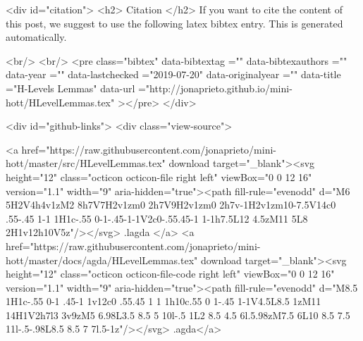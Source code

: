   
  <div id="citation">
  <h2> Citation </h2>
  If you want to cite the content of this post,
  we suggest to use the following latex bibtex entry.
  This is generated automatically.

  <br/>
  <br/>
  <pre class="bibtex"
       data-bibtextag =""
       data-bibtexauthors =""
       data-year =""
       data-lastchecked ="2019-07-20"
       data-originalyear =""
       data-title ="H-Levels Lemmas"
       data-url ="http://jonaprieto.github.io/mini-hott/HLevelLemmas.tex"
  ></pre>
  </div>
  

  <div id="github-links">
    <div class="view-source">
      
        <a href="https://raw.githubusercontent.com/jonaprieto/mini-hott/master/src/HLevelLemmas.tex" download target="_blank"><svg height="12" class="octicon octicon-file right left" viewBox="0 0 12 16" version="1.1" width="9" aria-hidden="true"><path fill-rule="evenodd" d="M6 5H2V4h4v1zM2 8h7V7H2v1zm0 2h7V9H2v1zm0 2h7v-1H2v1zm10-7.5V14c0 .55-.45 1-1 1H1c-.55 0-1-.45-1-1V2c0-.55.45-1 1-1h7.5L12 4.5zM11 5L8 2H1v12h10V5z"/></svg> .lagda </a>
        <a href="https://raw.githubusercontent.com/jonaprieto/mini-hott/master/docs/agda/HLevelLemmas.tex" download target="_blank"><svg height="12" class="octicon octicon-file-code right left" viewBox="0 0 12 16" version="1.1" width="9" aria-hidden="true"><path fill-rule="evenodd" d="M8.5 1H1c-.55 0-1 .45-1 1v12c0 .55.45 1 1 1h10c.55 0 1-.45 1-1V4.5L8.5 1zM11 14H1V2h7l3 3v9zM5 6.98L3.5 8.5 5 10l-.5 1L2 8.5 4.5 6l.5.98zM7.5 6L10 8.5 7.5 11l-.5-.98L8.5 8.5 7 7l.5-1z"/></svg> .agda</a>
      
